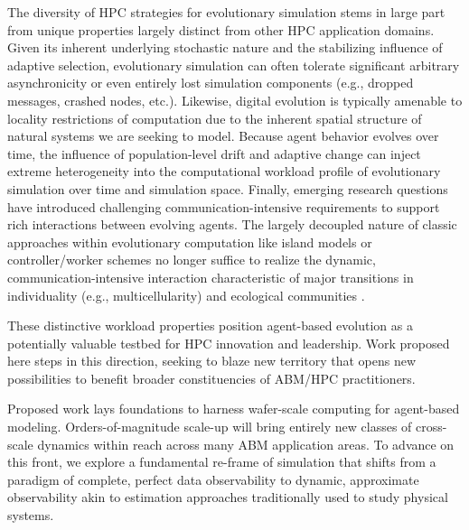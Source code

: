 The diversity of HPC strategies for evolutionary simulation stems in large part from unique properties largely distinct from other HPC application domains.
Given its inherent underlying stochastic nature and the stabilizing influence of adaptive selection, evolutionary simulation can often tolerate significant arbitrary asynchronicity or even entirely lost simulation components (e.g., dropped messages, crashed nodes, etc.).
Likewise, digital evolution is typically amenable to locality restrictions of computation due to the inherent spatial structure of natural systems we are seeking to model.
Because agent behavior evolves over time, the influence of population-level drift and adaptive change can inject extreme heterogeneity into the computational workload profile of evolutionary simulation over time and simulation space.
Finally, emerging research questions have introduced challenging communication-intensive requirements to support rich interactions between evolving agents.
The largely decoupled nature of classic approaches within evolutionary computation like island models or controller/worker schemes  \citep{bennett1999building,cantu2001master} no longer suffice to realize the dynamic, communication-intensive interaction characteristic of major transitions in individuality (e.g., multicellularity) and ecological communities \citep{moreno2022engineering}.

These distinctive workload properties position agent-based evolution as a potentially valuable testbed for HPC innovation and leadership.
Work proposed here steps in this direction, seeking to blaze new territory that opens new possibilities to benefit broader constituencies of ABM/HPC practitioners.


Proposed work lays foundations to harness wafer-scale computing for agent-based modeling.
Orders-of-magnitude scale-up will bring entirely new classes of cross-scale dynamics within reach across many ABM application areas.
To advance on this front, we explore a fundamental re-frame of simulation that shifts from a paradigm of complete, perfect data observability to dynamic, approximate observability akin to estimation approaches traditionally used to study physical systems.

